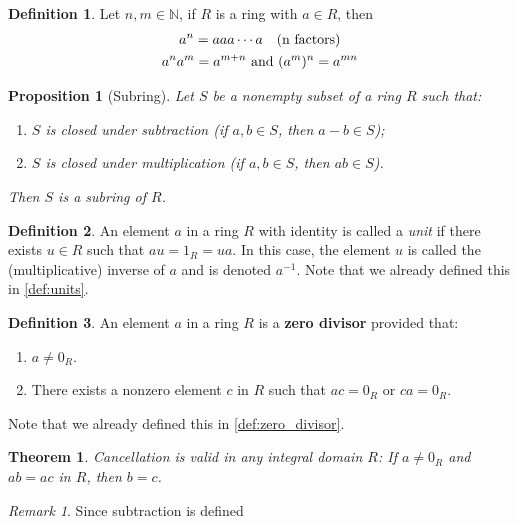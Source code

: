 \documentclass{article}
\newtheorem{theorem}{Theorem}[section]
\newtheorem{proposition}{Proposition}[section]
\theoremstyle{definition}
\newtheorem{definition}{Definition}[section]
\theoremstyle{remark}
\newtheorem{remark}{Remark}[section]
\begin{document}
\begin{definition}\label{ex:def of exponential}
Let $n,m \in \mathbb{N}$, if \(R\) is a ring with $a\in R$, then
\begin{gather*}
a^n = aaa\cdots a \quad (\textnormal{n factors})\\
a^na^m = a^{m+n} \textnormal{ and } (a^m)^n = a^{mn}
\end{gather*}


\end{definition}






\begin{proposition}[Subring]\label{thm:check for subring_p2}
Let $S$ be a nonempty subset of a ring $R$ such that:
\begin{enumerate}
\item $S$ is closed under subtraction (if $a, b \in S$, then $a - b \in S$);
\item $S$ is closed under multiplication (if $a, b \in S$, then $ab \in S$).
\end{enumerate}
Then $S$ is a subring of $R$.
\end{proposition}






\begin{definition}\label{def:units p2}
An element $a$ in a ring $R$ with identity is called a \textit{unit} if there exists $u \in R$ such that $au = 1_R = ua$. In this case, 
the element $u$ is called the (multiplicative) inverse of $a$ and is
denoted $a^{-1}$. Note that we already defined this in \ref{def:units}.
\end{definition}







\begin{definition}\label{def:zero divisor p2}
An element $a$ in a ring $R$ is a \textbf{zero divisor} provided that:
\begin{enumerate}
\item $a \neq 0_R$.
\item There exists a nonzero element $c$ in $R$ such that $ac = 0_R$ or $ca = 0_R$.
\end{enumerate}
Note that we already defined this in \ref{def:zero_divisor}.
\end{definition}




\begin{theorem}\label{thm:cancellation of Multiplication}
Cancellation is valid in any integral domain $R$: If $a \neq 0_R$ and $ab = ac$ in $R$, then $b = c$.
\end{theorem}
\begin{remark}
Since subtraction is defined 
\end{remark}
\end{document}
